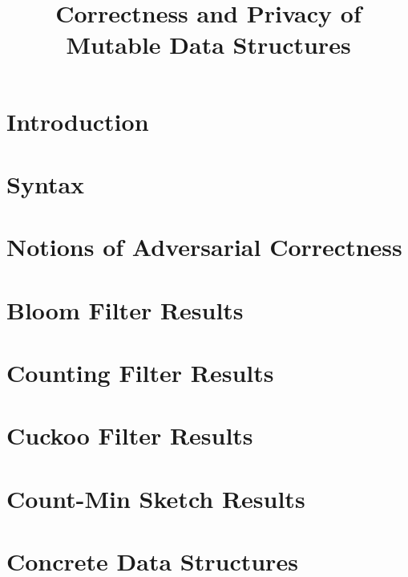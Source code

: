 \documentclass{article}
\title{\bf Correctness and Privacy of Mutable Data Structures}
\begin{document}
\maketitle

\tableofcontents

%

\section{Introduction}
%

\section{Syntax}
\label{sec:syntax}


\section{Notions of Adversarial Correctness}
\label{sec:correctness}


\section{Bloom Filter Results}
\label{sec:bloom}

\section{Counting Filter Results}
\label{sec:counting}

\section{Cuckoo Filter Results}
\label{cuckoo}

\section{Count-Min Sketch Results}
\label{cms}

\section{Concrete Data Structures}
\label{sec:structures}


%
\end{document}

